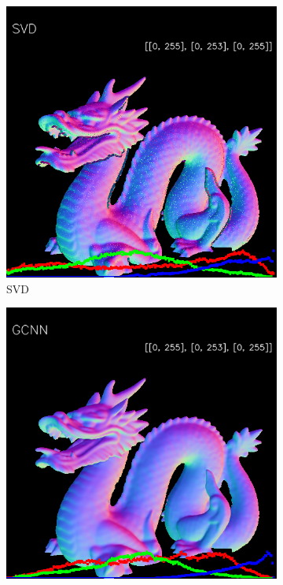 \begin{figure}[h!]
\begin{subfigure}[b]{0.24\linewidth}
		\includegraphics[width=\linewidth]{./Figures/comparison/fancy_eval_3_normal_svd.png}
		\caption{SVD}
	\end{subfigure}
	\begin{subfigure}[b]{0.24\linewidth}
		\includegraphics[width=\linewidth]{./Figures/comparison/fancy_eval_3_normal_GCNN.png}

\end{subfigure}
\end{figure}
